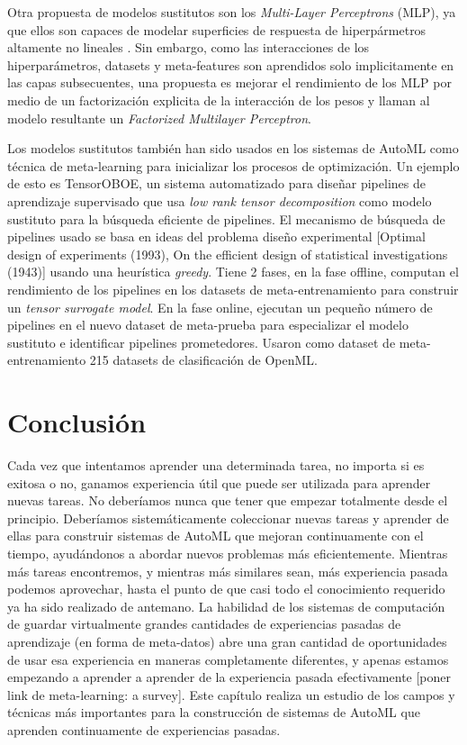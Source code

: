 Otra propuesta de modelos sustitutos son los \textit{Multi-Layer Perceptrons} (MLP), ya que ellos son capaces de modelar superficies de respuesta de hiperpármetros altamente no lineales \cite{schilling2015hyp}. Sin embargo, como las interacciones de los hiperparámetros, datasets y meta-features son aprendidos solo implicitamente en las capas subsecuentes, una propuesta es mejorar el rendimiento de los MLP por medio de un factorización explicita de la interacción de los pesos y llaman al modelo resultante un \textit{Factorized Multilayer Perceptron}.

Los modelos sustitutos también han sido usados en los sistemas de AutoML como técnica de meta-learning para inicializar los procesos de optimización. Un ejemplo de esto es TensorOBOE, un sistema automatizado para diseñar pipelines de aprendizaje supervisado que usa \textit{low rank tensor decomposition} como modelo sustituto para la búsqueda eficiente de pipelines. El mecanismo de búsqueda de pipelines usado se basa en ideas del problema diseño experimental [Optimal design of experiments (1993), On the efficient design of statistical investigations (1943)] usando una heurística \textit{greedy}. Tiene 2 fases, en la fase offline, computan el rendimiento de los pipelines en los datasets de meta-entrenamiento para construir un \textit{tensor surrogate model}. En la fase online, ejecutan un pequeño número de pipelines en el nuevo dataset de meta-prueba para especializar el modelo sustituto e identificar pipelines prometedores. Usaron como dataset de meta-entrenamiento 215 datasets de clasificación de OpenML.


\section{Conclusión}\label{sec:conclusion}

Cada vez que intentamos aprender una determinada tarea, no importa si es exitosa o no, ganamos experiencia útil que puede ser utilizada para aprender nuevas tareas. No deberíamos nunca que tener que empezar totalmente desde el principio. Deberíamos sistemáticamente coleccionar nuevas tareas y aprender de ellas para construir sistemas de AutoML que mejoran continuamente con el tiempo, ayudándonos a abordar nuevos problemas más eficientemente. Mientras más tareas encontremos, y mientras más similares sean, más experiencia pasada podemos aprovechar, hasta el punto de que casi todo el conocimiento requerido ya ha sido realizado de antemano. La habilidad de los sistemas de computación de guardar virtualmente grandes cantidades de experiencias pasadas de aprendizaje (en forma de meta-datos) abre una gran cantidad de oportunidades de usar esa experiencia en maneras completamente diferentes, y apenas estamos empezando a aprender a aprender de la experiencia pasada efectivamente [poner link de meta-learning: a survey]. Este capítulo realiza un estudio de los campos y técnicas más importantes para la construcción de sistemas de AutoML que aprenden continuamente de experiencias pasadas.


